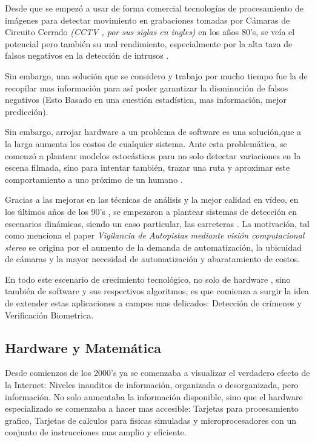 \documentclass[a4paper]{IEEEtranUNT}
\begin{document}
Desde que se empezó a usar de forma comercial tecnologías de procesamiento de imágenes para detectar movimiento en
grabaciones tomadas por Cámaras de Circuito Cerrado \textit{(CCTV , por sus siglas en ingles)} en los a\~nos 80's,
se veía el potencial pero también su mal rendimiento, especialmente por la alta taza de falsos negativos 
en la detección de intrusos \citep{Sage}.

Sin embargo, una solución que se considero y trabajo por mucho tiempo fue la de recopilar mas información para así poder
garantizar la disminución de falsos negativos (Esto Basado en una cuestión estadística, mas información, mejor predicción).

Sin embargo, arrojar hardware a un problema de software es una solución,que a la larga aumenta los costos de cualquier sistema.
Ante esta problemática, se comenzó a plantear modelos estocásticos para no solo detectar variaciones en la escena filmada, sino
para intentar también, trazar una ruta y aproximar este comportamiento a uno próximo de un humano \citep{Sage}.

Gracias a las mejoras en las técnicas de análisis y la mejor calidad en vídeo, en los últimos a\~nos de los 90's , se empezaron
a plantear sistemas de detección en escenarios dinámicas, siendo un caso particular, las carreteras \citep{Manendez}. La motivación,
tal como menciona el paper \textit{Vigilancia de Autopistas mediante visión computacional stereo} \citep[Abstract]{Manendez}
se origina por el aumento de la demanda de automatización, la ubicuidad de cámaras y la mayor necesidad de automatización y abaratamiento
de costos.

En todo este escenario de crecimiento tecnológico, no solo de hardware , sino también de software y sus respectivos algoritmos, es que
comienza a surgir la idea de extender estas aplicaciones a campos mas delicados: Detección de crímenes y Verificación Biometrica.

\subsection{Hardware y Matemática}

Desde comienzos de los 2000's ya se comenzaba a visualizar el verdadero efecto de la Internet: Niveles inauditos de información, organizada o desorganizada, pero información. No solo aumentaba la información disponible, sino que el hardware especializado se comenzaba a hacer mas accesible: Tarjetas para procesamiento grafico, Tarjetas de calculos para fisicas simuladas y microprocesadores con un conjunto de instrucciones mas amplio y eficiente.
\end{document}
